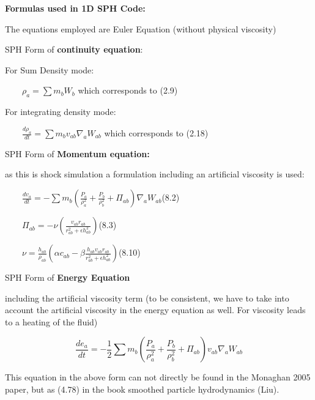 \documentclass[letterpaper]{article}
\title{}
\author{}
\date{2010-05-29}
\begin{document}
{\bfseries
Formulas used in 1D SPH Code:}


\bigskip

The equations employed are Euler Equation (without physical viscosity)


\bigskip

SPH Form of \textbf{continuity equation}:


\bigskip

For Sum Density mode:

\ \ \ \  $\rho _{a}=\sum {m_{b}W_{b}}$ which corresponds to (2.9)


\bigskip

For integrating density mode:

\ \ \ \  $\frac{d\rho _{a}}{\mathit{dt}}=\sum
{m_{b}v_{\mathit{ab}}\nabla _{a}W_{\mathit{ab}}}$ which corresponds to
(2.18)


\bigskip


\bigskip

SPH Form of \textbf{Momentum equation:}


\bigskip

as this is shock simulation a formulation including an artificial
viscosity is used:


\bigskip

\ \ \ \  $\frac{dv_{a}}{\mathit{dt}}=-\sum {m_{b}(\frac{P_{a}}{\rho
_{a}^{2}}+\frac{P_{b}}{\rho _{b}^{2}}+\Pi _{\mathit{ab}})\nabla
_{a}W_{\mathit{ab}}}$(8.2)


\bigskip

\ \ \ \  $\Pi _{\mathit{ab}}=-\nu
(\frac{v_{\mathit{ab}}r_{\mathit{ab}}}{r_{\mathit{ab}}^{2}+\epsilon
h_{\mathit{ab}}^{2}})$(8.3)


\bigskip

\ \ \ \  $\nu =\frac{h_{\mathit{ab}}}{\rho _{\mathit{ab}}}(\alpha
c_{\mathit{ab}}-\beta
\frac{h_{\mathit{ab}}v_{\mathit{ab}}r_{\mathit{ab}}}{r_{\mathit{ab}}^{2}+\epsilon
h_{\mathit{ab}}^{2}})$(8.10)


\bigskip


\bigskip

SPH Form of \textbf{Energy Equation}


\bigskip

including the artificial viscosity term (to be consistent, we have to
take into account the artificial viscosity in the energy equation as
well. For viscosity leads to a heating of the fluid)


\bigskip

\begin{equation*}
\frac{de_{a}}{\mathit{dt}}=-\mathit{}\frac{1}{2}\sum
{m_{b}(\frac{P_{a}}{\rho _{a}^{2}}+\frac{P_{b}}{\rho _{b}^{2}}+\Pi
_{\mathit{ab}})v_{\mathit{ab}}\nabla _{a}W_{\mathit{ab}}}
\end{equation*}

\bigskip

This equation in the above form can not directly be found in the
Monaghan 2005 paper, but as (4.78) in the book smoothed particle
hydrodynamics (Liu).
\end{document}
